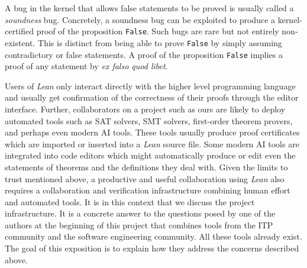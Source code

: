 \begin{remark}
    A bug in the kernel that allows false statements to be proved is usually called a \emph{soundness} bug. Concretely, a soundness bug can be exploited to produce a kernel-certified proof of the proposition \texttt{False}. Such bugs are rare but not entirely non-existent. This is distinct from being able to prove \texttt{False} by simply assuming contradictory or false statements. A proof of the proposition \texttt{False} implies a proof of any statement by \emph{ex falso quod libet}.
\end{remark}

Users of \emph{Lean} only interact directly with the higher level programming language and usually get confirmation of the correctness of their proofs through the editor interface. Further, collaborators on a project such as ours are likely to deploy automated tools such as SAT solvers, SMT solvers, first-order theorem provers, and perhaps even modern AI tools. These tools usually produce proof certificates which are imported or inserted into a \emph{Lean} source file. Some modern AI tools are integrated into code editors which might automatically produce or edit even the statements of theorems and the definitions they deal with. Given the limits to trust mentioned above, a productive and useful collaboration using \emph{Lean} also requires a collaboration and verification infrastructure combining human effort and automated tools. It is in this context that we discuss the project infrastructure. It is a concrete answer to the questions posed by one of the authors at the beginning of this project \cite{Tao_blog_Sep_2024} that combines tools from the ITP community and the software engineering community. All these tools already exist. The goal of this exposition is to explain how they address the concerns described above.


